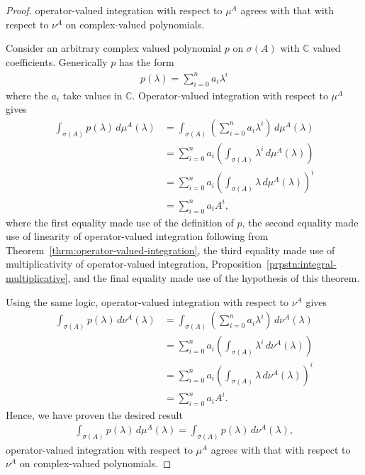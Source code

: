 \begin{proof}
    \leanok
operator-valued integration with respect to $\mu^A$ agrees with that with respect to $\nu^A$ on complex-valued polynomials.

Consider an arbitrary complex valued polynomial $p$ on $\sigma(A)$ with $\mathbb{C}$ valued coefficients. Generically $p$ has the form
\begin{align}
    p(\lambda) = \sum_{i=0}^n a_i\lambda^i
\end{align}
where the $a_i$ take values in $\mathbb{C}$. Operator-valued integration with respect to $\mu^A$ gives
\begin{align}
    \int_{\sigma(A)} p(\lambda) \, d\mu^A(\lambda) &=  \int_{\sigma(A)} \left( \sum_{i=0}^n a_i\lambda^i \right) \, d\mu^A(\lambda) \\
                                                   &=  \sum_{i=0}^n a_i \left( \int_{\sigma(A)} \lambda^i \, d\mu^A(\lambda) \right) \\
                                                   &=  \sum_{i=0}^n a_i \left( \int_{\sigma(A)} \lambda \, d\mu^A(\lambda) \right)^i \\
                                                   &=  \sum_{i=0}^n a_i A^i,
\end{align}
where the first equality made use of the definition of $p$, the second equality made use of linearity of operator-valued integration following from Theorem~\ref{thrm:operator-valued-integration}, the third equality made use of multiplicativity of operator-valued integration, Proposition~\ref{prpstn:integral-multiplicative}, and the final equality made use of the hypothesis of this theorem.

Using the same logic, operator-valued integration with respect to $\nu^A$ gives
\begin{align}
    \int_{\sigma(A)} p(\lambda) \, d\nu^A(\lambda) &=  \int_{\sigma(A)} \left( \sum_{i=0}^n a_i\lambda^i \right) \, d\nu^A(\lambda) \\
                                                   &=  \sum_{i=0}^n a_i \left( \int_{\sigma(A)} \lambda^i \, d\nu^A(\lambda) \right) \\
                                                   &=  \sum_{i=0}^n a_i \left( \int_{\sigma(A)} \lambda \, d\nu^A(\lambda) \right)^i \\
                                                   &=  \sum_{i=0}^n a_i A^i.
\end{align}
Hence, we have proven the desired result
\begin{align}
    \int_{\sigma(A)} p(\lambda) \, d\mu^A(\lambda) = \int_{\sigma(A)} p(\lambda) \, d\nu^A(\lambda),
\end{align}
operator-valued integration with respect to $\mu^A$ agrees with that with respect to $\nu^A$ on complex-valued polynomials.
\end{proof}

